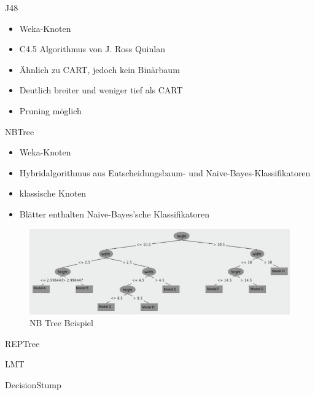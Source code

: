 \documentclass[
	handout,
  	aspectratio=169
]{beamer}
\begin{document}
		\begin{frame}{J48}		
			\begin{itemize}
				\item Weka-Knoten
				\item C4.5 Algorithmus von J. Ross Quinlan
				\item Ähnlich zu CART, jedoch kein Binärbaum
				\item Deutlich breiter und weniger tief als CART
				\item Pruning möglich
			\end{itemize}
		\end{frame}

		\begin{frame}{NBTree}
			\begin{itemize}
				\item Weka-Knoten
				\item Hybridalgorithmus aus Entscheidungsbaum- und Naive-Bayes-Klassifikatoren
				\item \glqq{}klassische\grqq{} Knoten
				\item Blätter enthalten Naive-Bayes’sche Klassifikatoren
			\end{itemize}	
			
			\begin{center}
				\begin{figure}[h]
					\includegraphics[scale=1]{../pictures/NBTree-classifying-MAC-Felinae.jpg}
					\caption{NB Tree Beispiel}		
				\end{figure}		
			\end{center}
			
			
		\end{frame}

		\begin{frame}{REPTree}		
		\end{frame}

		\begin{frame}{LMT}		
		\end{frame}

		\begin{frame}{DecisionStump}		
		\end{frame}
\end{document}
